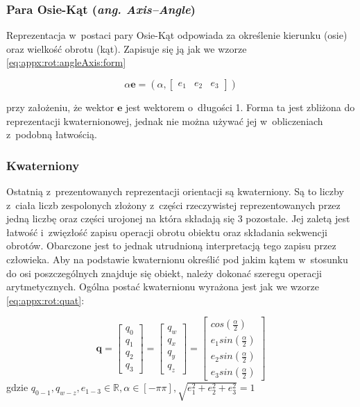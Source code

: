 \subsubsection*{Para Osie-Kąt (\emph{ang. Axis--Angle})}
Reprezentacja w~postaci pary Osie-Kąt odpowiada za określenie kierunku (osie) oraz wielkość obrotu (kąt). Zapisuje się ją jak we wzorze \ref{eq:appx:rot:angleAxis:form}
																												
\begin{equation}
	\alpha\mathbf{e} = (\alpha, \begin{bmatrix}e_1 & e_2 & e_3\end{bmatrix})
	\label{eq:appx:rot:angleAxis:form}
\end{equation}
																													
przy założeniu, że wektor $\mathbf{e}$ jest wektorem o~długości 1. 
Forma ta jest zbliżona do reprezentacji kwaternionowej, jednak nie można używać jej w~obliczeniach z~podobną łatwością.  
																													
\subsubsection*{Kwaterniony}
Ostatnią z~prezentowanych reprezentacji orientacji są kwaterniony. Są to liczby z~ciała liczb zespolonych złożony z~części rzeczywistej reprezentowanych przez jedną liczbę oraz części urojonej na która składają się 3 pozostałe. Jej zaletą jest łatwość i~zwięzłość zapisu operacji obrotu obiektu oraz składania sekwencji obrotów. Obarczone jest to jednak utrudnioną interpretacją tego zapisu przez człowieka. Aby na podstawie kwaternionu określić pod jakim kątem w~stosunku do osi poszczególnych znajduje się obiekt, należy dokonać szeregu operacji arytmetycznych. Ogólna postać kwaternionu wyrażona jest jak we wzorze \ref{eq:appx:rot:quat}:
																													
\begin{equation}
	\label{eq:appx:rot:quat}
	\mathbf{q} =
	\begin{bmatrix}
		q_0 \\
		q_1 \\
		q_2 \\
		q_3 
	\end{bmatrix} 
	= 	
	\begin{bmatrix}
		q_w \\
		q_x \\
		q_y \\
		q_z 
	\end{bmatrix} 
	= 
	\begin{bmatrix}
		cos(\frac{\alpha}{2})    \\
		e_1sin(\frac{\alpha}{2}) \\
		e_2sin(\frac{\alpha}{2}) \\
		e_3sin(\frac{\alpha}{2}) 
	\end{bmatrix}
\end{equation}
gdzie $q_{0-1}, q_{w-z}, e_{1-3} \in \mathbb{R}, \alpha \in [-\pi \pi], \sqrt{e_1^2 + e_2^2 + e_3^2} = 1$
																													

